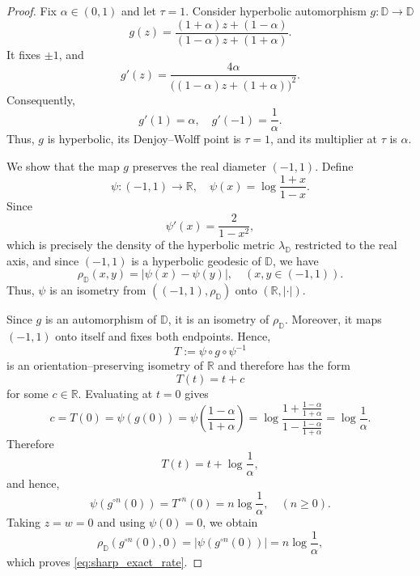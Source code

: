 \documentclass[12pt]{amsart}
\numberwithin{equation}{section}
\theoremstyle{plain}
\theoremstyle{definition}
\begin{document}
\begin{proof}
Fix $\alpha\in(0,1)$ and let $\tau=1$. Consider hyperbolic
automorphism $g:\mathbb{D}\to \mathbb{D}$
\begin{equation}
\label{eq:sharpness_automorphism}
g(z)
=
\frac{(1+\alpha)z+(1-\alpha)}
     {(1-\alpha)z+(1+\alpha)}.
\end{equation}
It fixes $\pm1$, and
\begin{equation*}
g'(z)
=
\frac{4\alpha}
{\bigl((1-\alpha)z+(1+\alpha)\bigr)^2}.
\end{equation*}
Consequently,
\begin{equation*}
g'(1)=\alpha,
\quad
g'(-1)=\frac{1}{\alpha}.
\end{equation*}
Thus, $g$ is hyperbolic, its Denjoy--Wolff point is $\tau=1$, and its
multiplier at $\tau$ is $\alpha$.

We show that the map $g$ preserves the real diameter $(-1,1)$. Define
\begin{equation*}
\psi:(-1,1)\to\mathbb{R},
\quad
\psi(x)=\log\frac{1+x}{1-x}.
\end{equation*}
Since
\begin{equation*}
\psi'(x)=\frac{2}{1-x^2},
\end{equation*}
which is precisely the density of the hyperbolic metric
$\lambda_{\mathbb{D}}$ restricted to the real axis, and since
$(-1,1)$ is a hyperbolic geodesic of $\mathbb{D}$, we have
\begin{equation*}
\rho_{\mathbb{D}}(x,y)
=
|\psi(x)-\psi(y)|,
\quad (x,y\in(-1,1)).
\end{equation*}
Thus, $\psi$ is an isometry from
$((-1,1),\rho_{\mathbb{D}})$ onto $(\mathbb{R},|\cdot|)$.

Since $g$ is an automorphism of $\mathbb{D}$, it is an isometry of
$\rho_{\mathbb{D}}$. Moreover, it maps $(-1,1)$ onto itself and fixes
both endpoints. Hence,
\begin{equation*}
T:=\psi\circ g\circ\psi^{-1}
\end{equation*}
is an orientation--preserving isometry of $\mathbb{R}$ and therefore
has the form
\begin{equation*}
T(t)=t+c
\end{equation*}
for some $c\in\mathbb{R}$. Evaluating at $t=0$ gives
\begin{equation*}
c
=T(0)
=\psi(g(0))
=\psi\left(\frac{1-\alpha}{1+\alpha}\right)
=
\log
\frac{
1+\frac{1-\alpha}{1+\alpha}
}{
1-\frac{1-\alpha}{1+\alpha}
}
=
\log\frac{1}{\alpha}.
\end{equation*}
Therefore
\begin{equation*}
T(t)=t+\log\frac{1}{\alpha},
\end{equation*}
and hence,
\begin{equation*}
\psi(g^{\circ n}(0))
=
T^{\circ n}(0)
=
n\log\frac{1}{\alpha},
\quad(n\geq0).
\end{equation*}
Taking $z=w=0$ and using $\psi(0)=0$, we obtain
\begin{equation*}
\rho_{\mathbb{D}}(g^{\circ n}(0),0)
=
\left|\psi(g^{\circ n}(0))\right|
=
n\log\frac{1}{\alpha},
\end{equation*}
which proves \eqref{eq:sharp_exact_rate}.


\end{proof}
\end{document}

